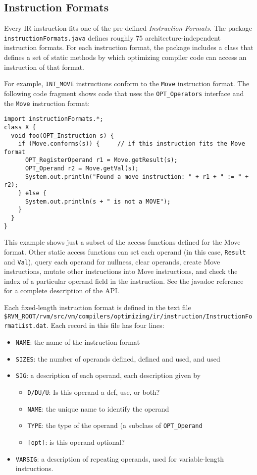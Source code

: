 \PowerPCTMFooter

\subsection{Instruction Formats}\label{iformats}

Every IR instruction fits one of the pre-defined {\em Instruction Formats}.
The package {\tt instructionFormats.java} defines roughly 75 architecture-independent
instruction formats.  For each instruction format, the package includes a class
that defines a set of static methods by which optimizing compiler
code can access an instruction of that format.

For example, {\tt INT\_MOVE} instructions conform to the {\tt Move}
instruction format.  The following code fragment shows code that uses the
{\tt OPT\_Operators} interface and the {\tt Move} instruction format:
\begin{verbatim}
import instructionFormats.*;
class X {
  void foo(OPT_Instruction s) {
    if (Move.conforms(s)) {     // if this instruction fits the Move format
      OPT_RegisterOperand r1 = Move.getResult(s);
      OPT_Operand r2 = Move.getVal(s);
      System.out.println("Found a move instruction: " + r1 + " := " + r2);
    } else {
      System.out.println(s + " is not a MOVE");
    }
  }
}
\end{verbatim}

This example shows just a subset of the access functions defined for the
Move format.  Other static access functions can set each operand 
(in this case, {\tt Result} and {\tt Val}), query each operand for
nullness, clear operands, create Move instructions, mutate other
instructions into Move instructions, and check the index of a particular
operand field in the instruction.  See the javadoc reference for a complete
description of the API.

Each fixed-length instruction format is defined in the text file 
{\tt \$RVM\_ROOT/rvm/src/vm/compilers/optimizing/ir/instruction/InstructionFormatList.dat}.
Each record in this file has four lines:
\begin{itemize}
\item {\tt NAME}: the name of the instruction format
\item {\tt SIZES}: the number of operands defined, defined and used, and used 
\item {\tt SIG}: a description of each operand, each description given
by
\begin{itemize}
\item {\tt D/DU/U}: Is this operand a def, use, or both?
\item {\tt NAME}: the unique name to identify the operand
\item {\tt TYPE}: the type of the operand (a subclass of {\tt OPT\_Operand}
\item {\tt [opt]}: is this operand optional?
\end{itemize}
\item {\tt VARSIG}: a description of repeating operands, used for
variable-length instructions.
\end{itemize}


